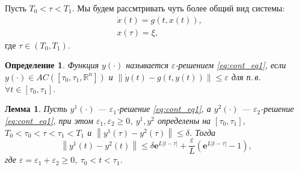 \documentclass[12pt, a4paper]{article}
\theoremstyle{rusdef}
\newtheorem{define}{Определение} %
\newtheorem{lemma}{Лемма}
\newcommand\abs[1]{\left\lvert #1 \right\rvert} %
\newcommand{\R}{\ensuremath{\mathbb{R}}} %
\newcommand{\e}{\mathbf{e}}
\newcommand{\norm}[1]{\left\lVert #1 \right\rVert} %
\begin{document}
Пусть $T_0 < \tau < T_1$. Мы будем рассмтривать чуть более общий вид системы:
\begin{align}
&\dot{x}(t) = g(t, x(t)), \label{eq:cont_eq1} \\
&x(\tau) = \xi, \label{eq:cont_eq2}
\end{align}
где $\tau \in (T_0, T_1)$.

\begin{define}
Функция $y(\cdot)$ называется $\varepsilon$-решением \eqref{eq:cont_eq1}, если $y(\cdot) \in AC([\tau_0, \tau_1, \R^n])$ и $\norm{\dot{y}(t) - g(t, y(t))} \leqslant \varepsilon$ для п.\,в. $\dot{\forall} t \in [\tau_0, \tau_1]$.
\end{define}

\begin{lemma}
Пусть $y^1(\cdot)$ --- $\varepsilon_1$-решение \eqref{eq:cont_eq1}, а $y^2(\cdot)$ --- $\varepsilon_2$-решение \eqref{eq:cont_eq1}, при этом $\varepsilon_1, \varepsilon_2 \geqslant 0$, $y^1, y^2$ определены на $[\tau_0, \tau_1]$, $T_0 < \tau_0 < \tau < \tau_1 < T_1$ и $\norm{y^1(\tau) - y^2(\tau)} \leqslant \delta$. Тогда 
$$
\norm{y^1(t) - y^2(t)} \leqslant \delta \e^{L \abs{t - \tau}} + \dfrac{\varepsilon}{L}\left( \e^{L \abs{t - \tau}} - 1 \right),
$$
где $\varepsilon = \varepsilon_1 + \varepsilon_2 \geqslant 0$, $\tau_0 < t < \tau_1$.
\end{lemma}
\end{document}

